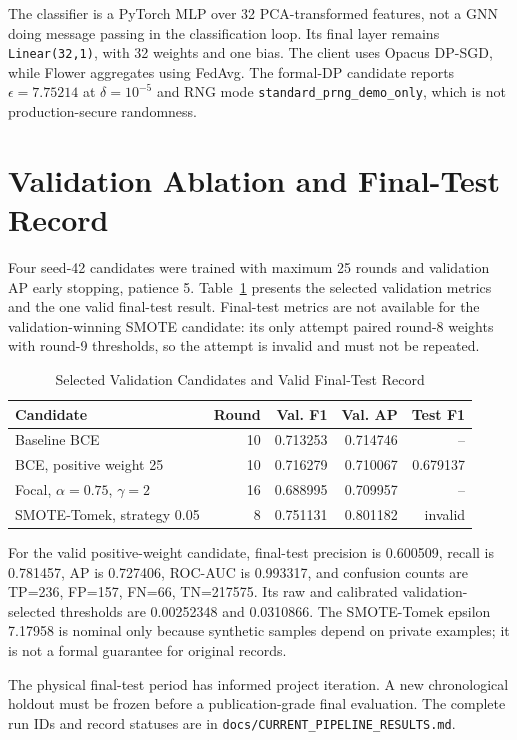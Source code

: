 \documentclass[10pt,conference,letterpaper]{IEEEtran}
\begin{document}
The classifier is a PyTorch MLP over 32 PCA-transformed features, not a GNN doing message passing in the classification loop. Its final layer remains \texttt{Linear(32,1)}, with 32 weights and one bias. The client uses Opacus DP-SGD, while Flower aggregates using FedAvg. The formal-DP candidate reports $\epsilon=7.75214$ at $\delta=10^{-5}$ and RNG mode \texttt{standard\_prng\_demo\_only}, which is not production-secure randomness.

\section{Validation Ablation and Final-Test Record}
Four seed-42 candidates were trained with maximum 25 rounds and validation AP early stopping, patience 5. Table~\ref{tab:metrics} presents the selected validation metrics and the one valid final-test result. Final-test metrics are not available for the validation-winning SMOTE candidate: its only attempt paired round-8 weights with round-9 thresholds, so the attempt is invalid and must not be repeated.

\begin{table}[t]
\caption{Selected Validation Candidates and Valid Final-Test Record}
\label{tab:metrics}
\centering
\footnotesize
\begin{tabular}{lrrrr}
\toprule
Candidate & Round & Val. F1 & Val. AP & Test F1 \\
\midrule
Baseline BCE & 10 & 0.713253 & 0.714746 & -- \\
BCE, positive weight 25 & 10 & 0.716279 & 0.710067 & 0.679137 \\
Focal, $\alpha=0.75$, $\gamma=2$ & 16 & 0.688995 & 0.709957 & -- \\
SMOTE-Tomek, strategy 0.05 & 8 & 0.751131 & 0.801182 & invalid \\
\bottomrule
\end{tabular}
\end{table}

For the valid positive-weight candidate, final-test precision is 0.600509, recall is 0.781457, AP is 0.727406, ROC-AUC is 0.993317, and confusion counts are TP=236, FP=157, FN=66, TN=217575. Its raw and calibrated validation-selected thresholds are 0.00252348 and 0.0310866. The SMOTE-Tomek epsilon 7.17958 is nominal only because synthetic samples depend on private examples; it is not a formal guarantee for original records.

The physical final-test period has informed project iteration. A new chronological holdout must be frozen before a publication-grade final evaluation. The complete run IDs and record statuses are in \texttt{docs/CURRENT\_PIPELINE\_RESULTS.md}.
\end{document}
